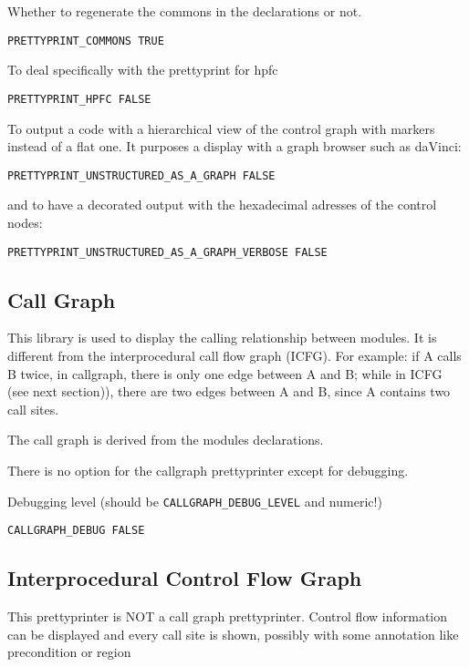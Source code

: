 Whether to regenerate the commons in the declarations or not.

\begin{verbatim}
PRETTYPRINT_COMMONS TRUE
\end{verbatim}

To deal specifically with the prettyprint for hpfc

\begin{verbatim}
PRETTYPRINT_HPFC FALSE
\end{verbatim}

To output a code with a hierarchical view of the control graph with
markers instead of a flat one. It purposes a display with a graph
browser such as daVinci:

\begin{verbatim}
PRETTYPRINT_UNSTRUCTURED_AS_A_GRAPH FALSE
\end{verbatim}

and to have a decorated output with the hexadecimal adresses of the
control nodes:
\begin{verbatim}
PRETTYPRINT_UNSTRUCTURED_AS_A_GRAPH_VERBOSE FALSE
\end{verbatim}

\subsection{Call Graph}

This library is used to display the calling relationship between
modules.  It is different from the interprocedural call flow graph
(ICFG). For  example: if A calls B twice, in
callgraph, there is only one edge between A and B; while in ICFG (see
next section)), there are two edges between A and B, since A contains
two call sites.  

The call graph is derived from the modules declarations.

There is no option for the callgraph prettyprinter except
for debugging.

Debugging level (should be \verb+CALLGRAPH_DEBUG_LEVEL+ and numeric!)

\begin{verbatim}
CALLGRAPH_DEBUG FALSE
\end{verbatim}

\subsection{Interprocedural Control Flow Graph}

This prettyprinter is NOT a call graph prettyprinter. Control flow
information can be displayed and every call site is shown, possibly with
some annotation like precondition or region

